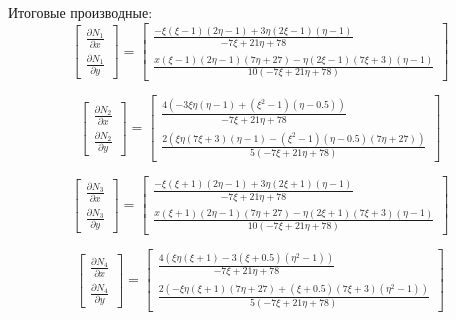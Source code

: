 \documentclass[a4paper, 12pt]{article}
\begin{document}
\begin{enumerate}
\begin{enumerate}
			Итоговые производные:
			\[
				\begin{bmatrix}
				\frac{\partial N_1}{\partial x} \\ 
				\frac{\partial N_1}{\partial y}
				\end{bmatrix}
				=
				\left[\begin{matrix}\frac{-\xi \left(\xi - 1\right) \left(2\eta - 1\right) + 3\eta \left(2\xi - 1\right) \left(\eta - 1\right)}{- 7\xi + 21\eta + 78}\\\frac{x \left(\xi - 1\right) \left(2\eta - 1\right) \left(7\eta + 27\right) -\eta \left(2\xi - 1\right) \left(7\xi + 3\right) \left(\eta - 1\right)}{10 \left(- 7\xi + 21\eta + 78\right)}\end{matrix}\right]
			\]

			\[
				\begin{bmatrix}
				\frac{\partial N_2}{\partial x} \\ 
				\frac{\partial N_2}{\partial y}
				\end{bmatrix}
				=
				\left[\begin{matrix}\frac{4 \left(- 3\xi\eta \left(\eta - 1\right) + \left(\xi^{2} - 1\right) \left(\eta - 0.5\right)\right)}{- 7\xi + 21\eta + 78}\\\frac{2 \left(\xi\eta \left(7\xi + 3\right) \left(\eta - 1\right) - \left(\xi^{2} - 1\right) \left(\eta - 0.5\right) \left(7\eta + 27\right)\right)}{5 \left(- 7\xi + 21\eta + 78\right)}\end{matrix}\right]
			\]

			\[
				\begin{bmatrix}
				\frac{\partial N_3}{\partial x} \\ 
				\frac{\partial N_3}{\partial y}
				\end{bmatrix}
				=
				\left[\begin{matrix}\frac{-\xi \left(\xi + 1\right) \left(2\eta - 1\right) + 3\eta \left(2\xi + 1\right) \left(\eta - 1\right)}{- 7\xi + 21\eta + 78}\\\frac{x \left(\xi + 1\right) \left(2\eta - 1\right) \left(7\eta + 27\right) -\eta \left(2\xi + 1\right) \left(7\xi + 3\right) \left(\eta - 1\right)}{10 \left(- 7\xi + 21\eta + 78\right)}\end{matrix}\right]
			\]

			\[
				\begin{bmatrix}
				\frac{\partial N_4}{\partial x} \\ 
				\frac{\partial N_4}{\partial y}
				\end{bmatrix}
				=
				\left[\begin{matrix}\frac{4 \left(\xi\eta \left(\xi + 1\right) - 3 \left(\xi + 0.5\right) \left(\eta^{2} - 1\right)\right)}{- 7\xi + 21\eta + 78}\\\frac{2 \left(-\xi\eta \left(\xi + 1\right) \left(7\eta + 27\right) + \left(\xi + 0.5\right) \left(7\xi + 3\right) \left(\eta^{2} - 1\right)\right)}{5 \left(- 7\xi + 21\eta + 78\right)}\end{matrix}\right]
			\]


\end{enumerate}
\end{enumerate}
\end{document}
